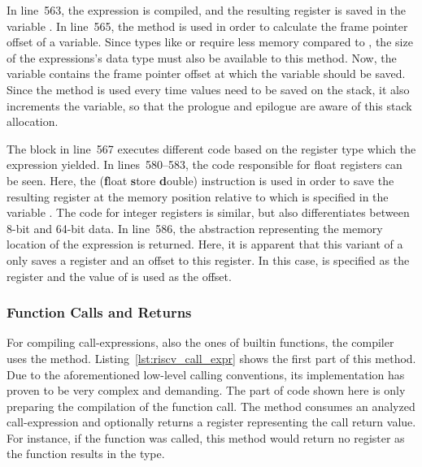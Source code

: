 
In line~563, the expression is compiled, and the resulting register is saved in the variable .
In line~565, the  method is used in order to calculate the frame pointer offset of a variable.
Since types like  or  require less memory compared to , the size of the expressions's data type must also be available to this method.
Now, the  variable contains the frame pointer offset at which the variable should be saved.
Since the  method is used every time values need to be saved on the stack,
it also increments the  variable, so that the prologue and epilogue are aware of this stack allocation.

The  block in line~567 executes different code based on the register type which the expression yielded.
In lines~580--583, the code responsible for float registers can be seen.
Here, the  (\textbf{f}loat \textbf{s}tore \textbf{d}ouble) instruction is used in order to save the resulting register at the memory position relative to  which is specified in the variable .
The code for integer registers is similar, but also differentiates between 8-bit and 64-bit data.
In line~586, the  abstraction representing the memory location of the expression is returned.
Here, it is apparent that this variant of a  only saves a register and an offset to this register.
In this case,  is specified as the register and the value of  is used as the offset.

\subsubsection{Function Calls and Returns}

For compiling call-expressions, also the ones of builtin functions, the compiler uses the  method.
Listing~\ref{lst:riscv_call_expr} shows the first part of this method.
Due to the aforementioned low-level calling conventions,
its implementation has proven to be very complex and demanding.
The part of code shown here is only preparing the compilation of the function call.
The method consumes an analyzed call-expression and optionally returns a register representing the call return value.
For instance, if the  function was called, this method would return no register as the  function results in the \qVerb{!} type.

